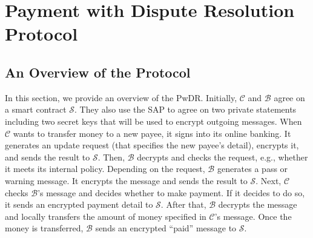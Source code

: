 






\vspace{-4mm}
\section{Payment with Dispute Resolution Protocol}\label{sec::PwDR-Protocol}


\vspace{-.5mm}

\subsection{An Overview of  the  Protocol}
\vspace{-.5mm}

In this section, we provide an overview of the   PwDR. Initially,     $\mathcal{C}$ and   $\mathcal{B}$   agree on a smart contract  $\mathcal{S}$. They also use the SAP to agree on two private statements including two secret keys that will be used to encrypt outgoing messages. When $\mathcal{C}$ wants to transfer money to a new payee, it signs into its online banking.  It generates an update request (that specifies the new payee's detail),  encrypts it, and sends the result to  $\mathcal{S}$. Then, $\mathcal{B}$ decrypts and checks the request, e.g.,  whether it meets its internal policy. Depending on the request, $\mathcal{B}$ generates a pass or warning message. It encrypts the message and sends the result to $\mathcal{S}$. Next, $\mathcal{C}$ checks $\mathcal{B}$'s message and decides whether to make payment. If it decides to do so,  it sends an encrypted payment detail to $\mathcal{S}$. After that, $\mathcal{B}$  decrypts the message and locally transfers the amount of money specified in $\mathcal{C}$'s message. Once the money is transferred, $\mathcal{B}$ sends an encrypted  ``paid'' message to $\mathcal{S}$. 


